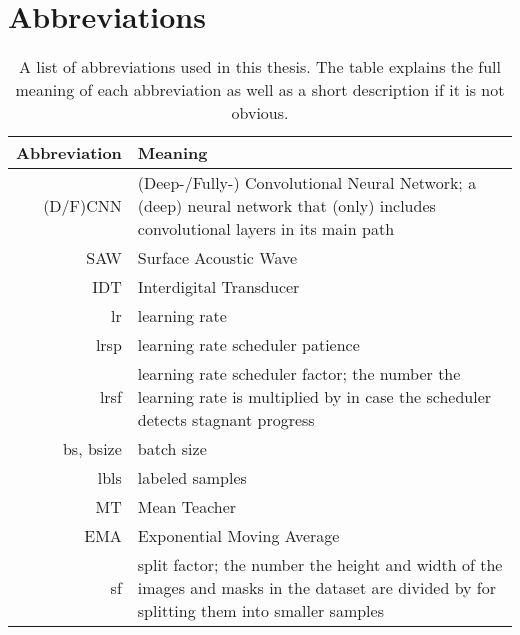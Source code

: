 \chapter{Abbreviations}
{
    \renewcommand*{\arraystretch}{1.1}
    \begin{table}[htbp]
        \centering
        \begin{tabular}{rp{}} 
            \toprule
            Abbreviation & Meaning\\
            \midrule 
            (D/F)CNN & (Deep-/Fully-) Convolutional Neural Network; a (deep) neural network that (only) includes convolutional layers in its main path\\
            SAW & Surface Acoustic Wave\\
            IDT & Interdigital Transducer\\
            lr & learning rate\\
            lrsp & learning rate scheduler patience\\
            lrsf & \linespread{1.0}\selectfont learning rate scheduler factor; the number the learning rate is multiplied by in case the scheduler detects stagnant progress\\
            bs, bsize & batch size\\
            lbls & labeled samples \\
            MT & Mean Teacher \\
            EMA & Exponential Moving Average \\
            sf & \linespread{1.0}\selectfont split factor; the number the height and width of the images and masks in the dataset are divided by for splitting them into smaller samples\\
            \bottomrule
        \end{tabular}
        \vspace{0.1cm}
        \caption{A list of abbreviations used in this thesis. The table explains the full meaning of each abbreviation as well as a short description if it is not obvious.}
        \label{tab:abbreviations}
    \end{table}
}